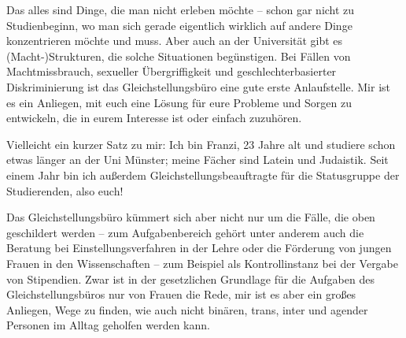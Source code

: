 \begin{multicols}{2}
Das alles sind Dinge, die man nicht erleben möchte – schon gar nicht zu Studienbeginn, wo man sich gerade eigentlich wirklich auf andere Dinge konzentrieren möchte und muss. Aber auch an der Universität gibt es (Macht-)Strukturen, die solche Situationen begünstigen. 
Bei Fällen von Machtmissbrauch, sexueller Übergriffigkeit und geschlechterbasierter Diskriminierung ist das Gleichstellungsbüro eine gute erste Anlaufstelle. Mir ist es ein Anliegen, mit euch eine Lösung für eure Probleme und Sorgen zu entwickeln, die in eurem Interesse ist oder einfach zuzuhören. 

Vielleicht ein kurzer Satz zu mir: Ich bin Franzi, 23 Jahre alt und studiere schon etwas länger an der Uni Münster; meine Fächer sind Latein und Judaistik. Seit einem Jahr bin ich außerdem Gleichstellungsbeauftragte für die Statusgruppe der Studierenden, also euch!

Das Gleichstellungsbüro kümmert sich aber nicht nur um die Fälle, die oben geschildert werden – zum Aufgabenbereich gehört unter anderem auch die Beratung bei Einstellungsverfahren in der Lehre oder die Förderung von jungen Frauen in den Wissenschaften – zum Beispiel als Kontrollinstanz bei der Vergabe von Stipendien. 
Zwar ist in der gesetzlichen Grundlage für die Aufgaben des Gleichstellungsbüros nur von Frauen die Rede, mir ist es aber ein großes Anliegen, Wege zu finden, wie auch nicht binären, trans, inter und agender Personen im Alltag geholfen werden kann. 


\end{multicols}
